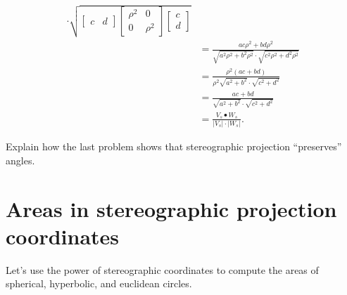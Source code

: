 \documentclass{ximera}
\begin{document}
\begin{problem}
\begin{freeResponse}
\begin{align*}
{          \cdot
          \sqrt{\begin{bmatrix}
            c & d
          \end{bmatrix}
          \begin{bmatrix}
            \rho^2 & 0 \\
            0 & \rho^2
          \end{bmatrix}
          \begin{bmatrix}
            c\\
            d
          \end{bmatrix}}
        }\\
        &= \frac{ac\rho^2 + bd\rho^2}{\sqrt{a^2\rho^2+b^2\rho^2}\cdot \sqrt{c^2\rho^2+d^2\rho^2}}\\
        &= \frac{\rho^2(ac + bd)}{\rho^2\sqrt{a^2+b^2}\cdot \sqrt{c^2+d^2}}\\
        &= \frac{ac + bd}{\sqrt{a^2+b^2}\cdot \sqrt{c^2+d^2}}\\
        &=\frac{V_s\bullet W_s}{|V_s|\cdot|W_s|}.
    \end{align*}
  \end{freeResponse}
\end{problem}


\begin{problem}
  Explain how the last problem shows that stereographic projection
  ``preserves'' angles. 
\end{problem}




















\section{Areas in stereographic projection coordinates}

Let's use the power of stereographic coordinates to compute the areas
of spherical, hyperbolic, and euclidean circles.
\end{document}
